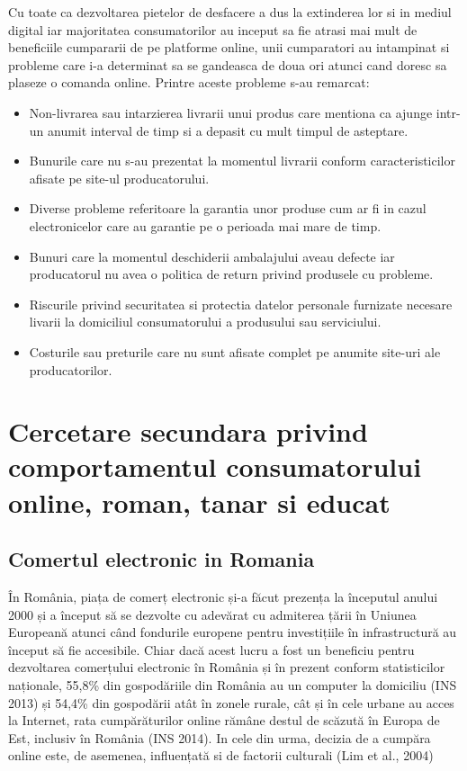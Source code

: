 \documentclass[a4paper, 12pt]{article}
\begin{document}
		\quad\quad Cu toate ca dezvoltarea pietelor de desfacere a dus la extinderea lor si in mediul digital iar majoritatea consumatorilor au inceput sa fie atrasi mai mult de beneficiile cumpararii de pe platforme online, unii cumparatori au intampinat si probleme care i-a determinat sa se gandeasca de doua ori atunci cand doresc sa plaseze o comanda online. Printre aceste probleme s-au remarcat: 
		\begin{itemize}
			\renewcommand{\labelitemi}{$\Rightarrow$}
			\item Non-livrarea sau intarzierea livrarii unui produs care mentiona ca ajunge intr-un anumit interval de timp si a depasit cu mult timpul de asteptare. 
			\item Bunurile care nu s-au prezentat la momentul livrarii conform caracteristicilor afisate pe site-ul producatorului.
			\item Diverse probleme referitoare la garantia unor produse cum ar fi in cazul electronicelor care au garantie pe o perioada mai mare de timp.
			\item  Bunuri care la momentul deschiderii ambalajului aveau defecte iar producatorul nu avea o politica de return privind produsele cu probleme.
			\item Riscurile privind securitatea si protectia datelor personale furnizate necesare livarii la domiciliul consumatorului a produsului sau serviciului.
			\item Costurile sau preturile care nu sunt afisate complet pe anumite site-uri ale producatorilor.
		\end{itemize}
	\newpage
\section{Cercetare secundara privind comportamentul consumatorului online, roman, tanar si educat}
	\subsection{Comertul electronic in Romania}
	\qquad  În România, piața de comerț electronic și-a făcut prezența la începutul anului 2000 și a început să se dezvolte cu adevărat cu admiterea țării în Uniunea Europeană atunci când fondurile europene pentru investițiile în infrastructură au început să fie accesibile. Chiar dacă acest lucru a fost un beneficiu pentru dezvoltarea comerțului electronic în România și în prezent conform statisticilor naționale, 55,8\% din gospodăriile din România au un computer la domiciliu (INS 2013) și 54,4\% din gospodării atât în zonele rurale, cât și în cele urbane au acces la Internet, rata cumpărăturilor online rămâne destul de scăzută în Europa de Est, inclusiv în România (INS 2014). In cele din urma, decizia de a cumpăra online este, de asemenea, influențată si de factorii culturali (Lim et al., 2004)
	
\end{document}
